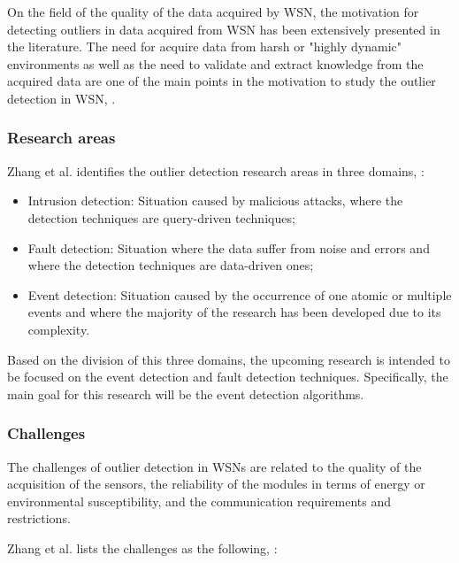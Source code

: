 On the field of the quality of the data acquired by \ac{WSN}, the motivation for detecting outliers in data acquired from \ac{WSN} has been extensively presented in the literature. The need for acquire data from harsh or "highly dynamic" environments as well as the need to validate and extract knowledge from the acquired data are one of the main points in the motivation to study the outlier detection in \ac{WSN},  \cite{gen:zhang:2010,gen:chandola:2009,stat:ghorbel:2015,class:martins:2015b}.



\subsubsection{Research areas}
Zhang et al. identifies the outlier detection research areas in three domains, \cite{gen:zhang:2010} : 

\begin{itemize}
	\item Intrusion detection: Situation caused by malicious attacks, where the detection techniques are query-driven techniques;
	
	\item Fault detection: Situation where the data suffer from noise and errors and where the detection techniques are data-driven ones;
	
	\item Event detection: Situation caused by the occurrence of one atomic or multiple events and where the majority of the research has been developed due to its complexity.
\end{itemize}

Based on the division of this three domains, the upcoming research is intended to be focused on the event detection and fault detection techniques. Specifically, the main goal for this research will be the event detection algorithms.


\subsubsection{Challenges}

The challenges of outlier detection in WSNs are related to the quality of the acquisition of the sensors, the reliability of the modules in terms of energy or environmental susceptibility, and the communication requirements and restrictions.

Zhang et al. lists the challenges as the following,  \cite{gen:zhang:2010}:


